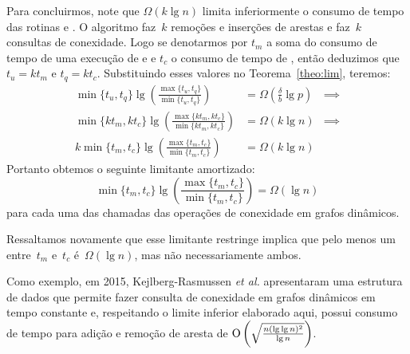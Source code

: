 Para concluirmos, note que $\Omega(k\lg n)$ limita inferiormente o consumo de tempo das rotinas \VPSPupdate{} e \VPSPverify{}. O algoritmo \VPSPupdate{} faz~$k$ remoções e inserções de arestas e \VPSPverify{} faz~$k$ consultas de conexidade. Logo se denotarmos por $t_m$ a soma do consumo de tempo de uma execução de \dymGraphAddEdge{} e \dymGraphDelEdge{} e $t_c$ o consumo de tempo de \dymGraphQuery{}, então deduzimos que $t_u = k t_m$ e $t_q = k t_c$. Substituindo esses valores no Teorema~\ref{theo:lim}, teremos:
\begin{align*}
\min\{t_u,t_q\}\lg \left( \frac{\max\{t_u,t_q\}}{\min\{t_u,t_q\}}\right) &= \Omega\left(\frac{\delta}{b}\lg p\right)&\implies\\
\min\{k t_m,k t_c\}\lg \left( \frac{\max\{k t_m,k t_c\}}{\min\{k t_m,k t_c\}}\right) &= \Omega(k \lg n)&\implies\\
k\min\{ t_m, t_c\}\lg \left( \frac{\max\{ t_m, t_c\}}{\min\{ t_m,t_c\}}\right) &= \Omega(k \lg n)
\end{align*}
Portanto obtemos o seguinte limitante amortizado: 
$$
\min\{ t_m, t_c\}\lg \left( \frac{\max\{ t_m, t_c\}}{\min\{ t_m,t_c\}}\right) = \Omega(\lg n)
$$
para cada uma das chamadas das operações de conexidade em grafos dinâmicos.

Ressaltamos novamente que esse limitante restringe implica que pelo menos um entre~$t_m$ e~$t_c$ é~$\Omega(\lg n)$, mas não necessariamente ambos.


Como exemplo, em 2015, Kejlberg-Rasmussen \textit{et al. }\cite{kejlbergrasmussen_et_al} apresentaram uma estrutura de dados que permite fazer consulta de conexidade em grafos dinâmicos em tempo constante e, respeitando o limite inferior elaborado aqui, possui consumo de tempo para adição e remoção de aresta de $\text{O}\left(\sqrt{\frac{n(\lg \lg n)^2}{\lg n}}\right)$.



